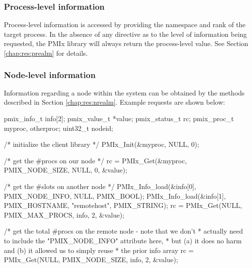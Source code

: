 \subsubsection{Process-level information}

Process-level information is accessed by providing the namespace and rank of the target process. In the absence of any directive as to the level of information being requested, the \ac{PMIx} library will always return the process-level value. See Section \ref{chap:res:prealm} for details.


\subsubsection{Node-level information}

Information regarding a node within the system can be obtained by the methods described in Section \ref{chap:res:nrealm}. Example requests are shown below:

\cspecificstart
\begin{codepar}
pmix_info_t info[2];
pmix_value_t *value;
pmix_status_t rc;
pmix_proc_t myproc, otherproc;
uint32_t nodeid;

/* initialize the client library */
PMIx_Init(&myproc, NULL, 0);

/* get the #procs on our node */
rc = PMIx_Get(&myproc, PMIX_NODE_SIZE, NULL, 0, &value);

/* get the #slots on another node */
PMIx_Info_load(&info[0], PMIX_NODE_INFO, NULL, PMIX_BOOL);
PMIx_Info_load(&info[1], PMIX_HOSTNAME, "remotehost", PMIX_STRING);
rc = PMIx_Get(NULL, PMIX_MAX_PROCS, info, 2, &value);

/* get the total #procs on the remote node - note that we don't
 * actually need to include the "PMIX_NODE_INFO" attribute here,
 * but (a) it does no harm and (b) it allowed us to simply reuse
 * the prior info array
rc = PMIx_Get(NULL, PMIX_NODE_SIZE, info, 2, &value);
\end{codepar}
\cspecificend

